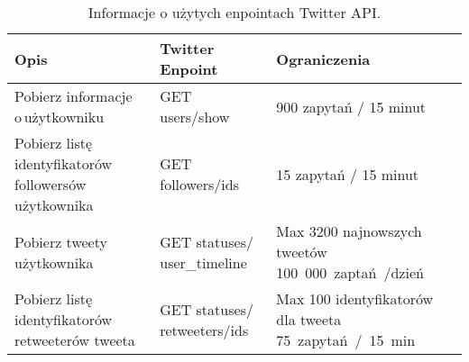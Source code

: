\begin{table}[!h] \label{tab:endointytwitter} \centering
\caption{Informacje o użytych enpointach Twitter API.}
\begin{tabular} { | m{} | m{}| m{} | } \hline
Opis & Twitter Enpoint & Ograniczenia \\  \hline \hline
Pobierz informacje o\,użytkowniku & GET users/show & 900 zapytań / 15 minut \\ \hline
Pobierz listę identyfikatorów followersów \mbox{użytkownika} & GET followers/ids & 15 zapytań / 15 minut \\ \hline
Pobierz tweety użytkownika & GET statuses/ user\_timeline & Max 3200 najnowszych tweetów \mbox{100 000 zaptań /dzień} \\ \hline
Pobierz listę identyfikatorów retweeterów tweeta & GET statuses/ retweeters/ids & Max 100 identyfikatorów dla tweeta \mbox{75 zapytań / 15 min} 
 \\ \hline
\end{tabular}
\end{table}


